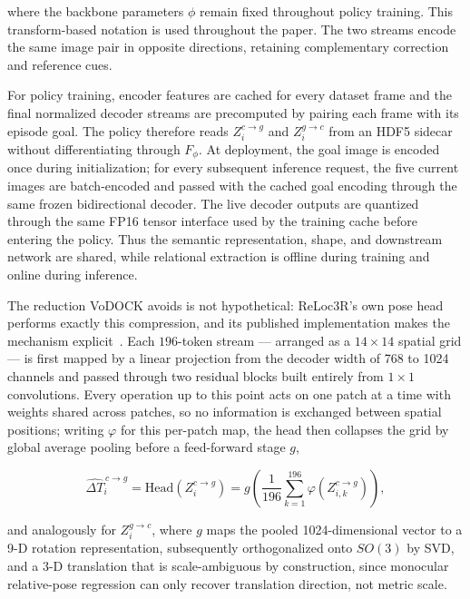 \documentclass[letterpaper, 10 pt, conference]{IEEEtran}  %
\begin{document}
where the backbone parameters $\phi$ remain fixed throughout policy training. This transform-based notation is used throughout the paper. The two streams encode the same image pair in opposite directions, retaining complementary correction and reference cues.

For policy training, encoder features are cached for every dataset frame and the final normalized decoder streams are precomputed by pairing each frame with its episode goal. The policy therefore reads $Z_i^{c\rightarrow g}$ and $Z_i^{g\rightarrow c}$ from an HDF5 sidecar without differentiating through $F_\phi$. At deployment, the goal image is encoded once during initialization; for every subsequent inference request, the five current images are batch-encoded and passed with the cached goal encoding through the same frozen bidirectional decoder. The live decoder outputs are quantized through the same FP16 tensor interface used by the training cache before entering the policy. Thus the semantic representation, shape, and downstream network are shared, while relational extraction is offline during training and online during inference.

The reduction VoDOCK avoids is not hypothetical: ReLoc3R's own pose head performs exactly this compression, and its published implementation makes the mechanism explicit~\cite{c4}. Each $196$-token stream --- arranged as a $14\times14$ spatial grid --- is first mapped by a linear projection from the decoder width of 768 to 1024 channels and passed through two residual blocks built entirely from $1\times1$ convolutions. Every operation up to this point acts on one patch at a time with weights shared across patches, so no information is exchanged between spatial positions; writing $\varphi$ for this per-patch map, the head then collapses the grid by global average pooling before a feed-forward stage $g$,

\begin{equation}
\widehat{\Delta T}_i^{\,c\rightarrow g}
=\mathrm{Head}\!\left(Z_i^{c\rightarrow g}\right)
=g\!\left(\frac{1}{196}\sum_{k=1}^{196}\varphi\!\left(Z_{i,k}^{c\rightarrow g}\right)\right),
\end{equation}

and analogously for $Z_i^{g\rightarrow c}$, where $g$ maps the pooled 1024-dimensional vector to a 9-D rotation representation, subsequently orthogonalized onto $SO(3)$ by SVD, and a 3-D translation that is scale-ambiguous by construction, since monocular relative-pose regression can only recover translation direction, not metric scale.
\end{document}

